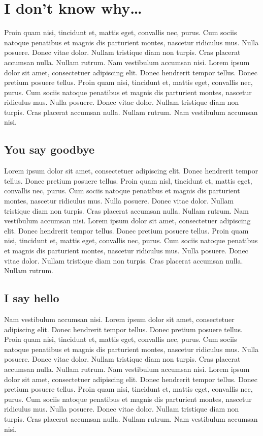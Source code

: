 \documentclass[12pt]{report}
\begin{document}
\section{I don't know why\dots}


Proin quam nisi, tincidunt et, mattis eget,
convallis nec, purus. Cum sociis natoque penatibus et magnis dis
parturient montes, nascetur ridiculus mus. Nulla posuere. Donec vitae
dolor. Nullam tristique diam non turpis. Cras placerat accumsan
nulla. Nullam rutrum. Nam vestibulum accumsan nisi.  Lorem ipsum dolor
sit amet, consectetuer adipiscing elit. Donec hendrerit tempor
tellus. Donec pretium posuere tellus. Proin quam nisi, tincidunt et,
mattis eget, convallis nec, purus. Cum sociis natoque penatibus et
magnis dis parturient montes, nascetur ridiculus mus. Nulla
posuere. Donec vitae dolor. Nullam tristique diam non turpis. Cras
placerat accumsan nulla. Nullam rutrum. Nam vestibulum accumsan nisi.

\subsection{You say goodbye}

Lorem ipsum dolor sit amet, consectetuer adipiscing elit. Donec
hendrerit tempor tellus. Donec pretium posuere tellus. Proin quam
nisl, tincidunt et, mattis eget, convallis nec, purus. Cum sociis
natoque penatibus et magnis dis parturient montes, nascetur ridiculus
mus. Nulla posuere. Donec vitae dolor. Nullam tristique diam non
turpis. Cras placerat accumsan nulla. Nullam rutrum. Nam vestibulum
accumsan nisi.  Lorem ipsum dolor sit amet, consectetuer adipiscing
elit. Donec hendrerit tempor tellus. Donec pretium posuere
tellus. Proin quam nisi, tincidunt et, mattis eget, convallis nec,
purus. Cum sociis natoque penatibus et magnis dis parturient montes,
nascetur ridiculus mus. Nulla posuere. Donec vitae dolor. Nullam
tristique diam non turpis. Cras placerat accumsan nulla. Nullam
rutrum. 

\subsection{I say hello}

Nam vestibulum accumsan nisi.  Lorem ipsum dolor sit amet,
consectetuer adipiscing elit. Donec hendrerit tempor tellus. Donec
pretium posuere tellus. Proin quam nisi, tincidunt et, mattis eget,
convallis nec, purus. Cum sociis natoque penatibus et magnis dis
parturient montes, nascetur ridiculus mus. Nulla posuere. Donec vitae
dolor. Nullam tristique diam non turpis. Cras placerat accumsan
nulla. Nullam rutrum. Nam vestibulum accumsan nisi.  Lorem ipsum dolor
sit amet, consectetuer adipiscing elit. Donec hendrerit tempor
tellus. Donec pretium posuere tellus. Proin quam nisi, tincidunt et,
mattis eget, convallis nec, purus. Cum sociis natoque penatibus et
magnis dis parturient montes, nascetur ridiculus mus. Nulla
posuere. Donec vitae dolor. Nullam tristique diam non turpis. Cras
placerat accumsan nulla. Nullam rutrum. Nam vestibulum accumsan nisi.
\end{document}

